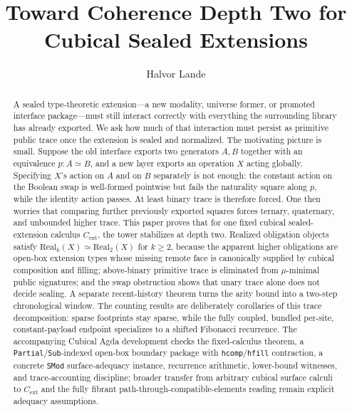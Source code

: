 \documentclass{lmcs}
\title[Toward Coherence Depth Two]{Toward Coherence Depth Two for Cubical Sealed Extensions}
\author[H.\ Lande]{Halvor Lande}
\newcommand{\Real}{\mathrm{Real}}
\newcommand{\Cext}{C_{\mathrm{ext}}}
\begin{document}
\begin{abstract}
\small
A sealed type-theoretic extension---a new modality, universe former, or promoted interface package---must still interact correctly with everything the surrounding library has already exported. We ask how much of that interaction must persist as primitive public trace once the extension is sealed and normalized. The motivating picture is small. Suppose the old interface exports two generators $A,B$ together with an equivalence $p:A\simeq B$, and a new layer exports an operation $X$ acting globally. Specifying $X$'s action on $A$ and on $B$ separately is not enough: the constant action on the Boolean swap is well-formed pointwise but fails the naturality square along $p$, while the identity action passes. At least binary trace is therefore forced. One then worries that comparing further previously exported squares forces ternary, quaternary, and unbounded higher trace. This paper proves that for one fixed cubical sealed-extension calculus $\Cext$, the tower stabilizes at depth two. Realized obligation objects satisfy $\Real_k(X)\simeq\Real_2(X)$ for $k\geq2$, because the apparent higher obligations are open-box extension types whose missing remote face is canonically supplied by cubical composition and filling; above-binary primitive trace is eliminated from $\mu$-minimal public signatures; and the swap obstruction shows that unary trace alone does not decide sealing. A separate recent-history theorem turns the arity bound into a two-step chronological window. The counting results are deliberately corollaries of this trace decomposition: sparse footprints stay sparse, while the fully coupled, bundled per-site, constant-payload endpoint specializes to a shifted Fibonacci recurrence. The accompanying Cubical Agda development checks the fixed-calculus theorem, a \texttt{Partial}/\texttt{Sub}-indexed open-box boundary package with \texttt{hcomp}/\texttt{hfill} contraction, a concrete \texttt{SMod} surface-adequacy instance, recurrence arithmetic, lower-bound witnesses, and trace-accounting discipline; broader transfer from arbitrary cubical surface calculi to $\Cext$ and the fully fibrant path-through-compatible-elements reading remain explicit adequacy assumptions.
\end{abstract}

\maketitle
\newpage
\setcounter{tocdepth}{2}
\tableofcontents
\newpage
\end{document}
